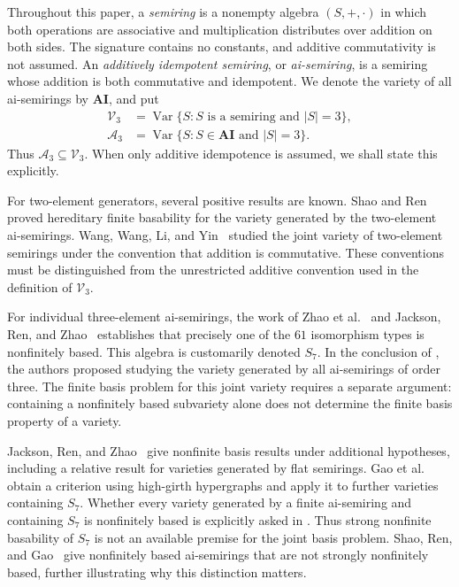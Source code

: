 \documentclass[11pt,reqno]{amsart}
\numberwithin{equation}{section}
\theoremstyle{definition}
\theoremstyle{remark}
\DeclareMathOperator{\Var}{Var}
\newcommand{\AI}{\mathbf{AI}}
\newcommand{\Vthree}{\mathcal V_3}
\newcommand{\Athree}{\mathcal A_3}
\begin{document}
Throughout this paper, a \emph{semiring} is a nonempty algebra
$(S,+,\cdot)$ in which both operations are associative and multiplication
distributes over addition on both sides. The signature contains no
constants, and additive commutativity is not assumed. An
\emph{additively idempotent semiring}, or \emph{ai-semiring}, is a
semiring whose addition is both commutative and idempotent. We denote
the variety of all ai-semirings by $\AI$, and put
\[
\begin{aligned}
\Vthree&=\Var\{S:S\text{ is a semiring and }|S|=3\},\\
\Athree&=\Var\{S:S\in\AI\text{ and }|S|=3\}.
\end{aligned}
\]
Thus $\Athree\subseteq\Vthree$. When only additive idempotence is
assumed, we shall state this explicitly.

For two-element generators, several positive results are known.
Shao and Ren~\cite{SR} proved hereditary finite basability for the
variety generated by the two-element ai-semirings. Wang, Wang, Li,
and Yin~\cite{WWLY} studied the joint variety of two-element semirings
under the convention that addition is commutative. These conventions
must be distinguished from the unrestricted additive convention used
in the definition of $\Vthree$.

For individual three-element ai-semirings, the work of Zhao
et al.~\cite{ZRCSD} and Jackson, Ren, and Zhao~\cite{JRZ} establishes
that precisely one of the $61$ isomorphism types is nonfinitely based.
This algebra is customarily denoted $S_7$. In the conclusion of
\cite[p.~130]{ZRCSD}, the authors proposed studying the variety
generated by all ai-semirings of order three. The finite basis problem
for this joint variety requires a separate argument: containing a
nonfinitely based subvariety alone does not determine the finite basis
property of a variety.

Jackson, Ren, and Zhao~\cite[Theorem~4.9 and Corollary~4.11]{JRZ}
give nonfinite basis results under additional hypotheses, including
a relative result for varieties generated by flat semirings.
Gao et al.~\cite[Theorem~2.2]{GJRZ2025} obtain a criterion using
high-girth hypergraphs and apply it to further varieties containing
$S_7$. Whether every variety generated by a finite ai-semiring and
containing $S_7$ is nonfinitely based is explicitly asked in
\cite[Problem~3.1]{GRSY2026}. Thus strong nonfinite basability of
$S_7$ is not an available premise for the joint basis problem.
Shao, Ren, and Gao~\cite{ShaoRenGao2026} give nonfinitely based
ai-semirings that are not strongly nonfinitely based, further
illustrating why this distinction matters.
\end{document}
